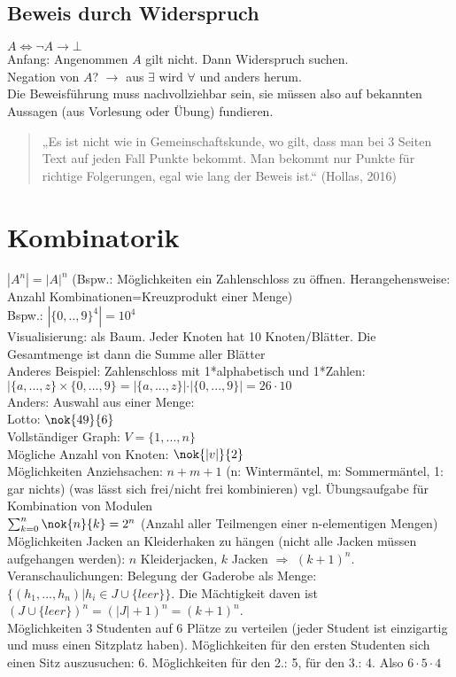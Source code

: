 \documentclass{scrreprt}
\begin{document}
\subsection{Beweis durch Widerspruch}
$A \Leftrightarrow \neg A \to \bot$\\
Anfang: Angenommen $A$ gilt nicht. Dann Widerspruch suchen.\\
Negation von $A$? $\rightarrow$ aus $\exists$ wird $\forall$ und anders herum. \\
Die Beweisführung muss nachvollziehbar sein, sie müssen also auf bekannten Aussagen (aus Vorlesung oder Übung) fundieren.
\begin{quote}
„Es ist nicht wie in Gemeinschaftskunde, wo gilt, dass man bei 3 Seiten Text auf jeden Fall Punkte bekommt. Man bekommt nur Punkte für richtige Folgerungen, egal wie lang der Beweis ist.“ (Hollas, 2016)
\end{quote}

\section{Kombinatorik}
$|A^n|=|A|^n$ (Bspw.: Möglichkeiten ein Zahlenschloss zu öffnen. Herangehensweise: Anzahl Kombinationen=Kreuzprodukt einer Menge)\\
Bspw.: $|\{0,..,9\}^4|=10^4$\\
Visualisierung: als Baum. Jeder Knoten hat 10 Knoten/Blätter. Die Gesamtmenge ist dann die Summe aller Blätter\\
Anderes Beispiel: Zahlenschloss mit 1*alphabetisch und 1*Zahlen:\\
$|\{a,...,z\}\times \{0,...,9\}= |\{a,...,z\}| \cdot |\{0,...,9\}| =26\cdot 10$ \bigskip\\
Anders: Auswahl aus einer Menge:\\
Lotto: $\nok{49}{6}$\\
Vollständiger Graph: $V=\{1,...,n\}$\\
Mögliche Anzahl von Knoten: $\nok{|v|}{2}$\\
Möglichkeiten Anziehsachen: $n+m+1$ (n: Wintermäntel, m: Sommermäntel, 1: gar nichts) (was lässt sich frei/nicht frei kombinieren) vgl. Übungsaufgabe für Kombination von Modulen\\
$\sum_{k=0}^{n}\nok{n}{k}=2^n$ (Anzahl aller Teilmengen einer n-elementigen Mengen)\medskip\\
Möglichkeiten Jacken an Kleiderhaken zu hängen (nicht alle Jacken müssen aufgehangen werden): $n$ Kleiderjacken, $k$ Jacken $\Rightarrow$ $(k+1)^n$. Veranschaulichungen: Belegung der Gaderobe als Menge: $\{(h_1,...,h_n)|h_i \in J \cup \{leer\}\}$. Die Mächtigkeit daven ist $(J\cup \{leer\})^n=(|J|+1)^n=(k+1)^n$.\\
Möglichkeiten 3 Studenten auf 6 Plätze zu verteilen (jeder Student ist einzigartig und muss einen Sitzplatz haben). Möglichkeiten für den ersten Studenten sich einen Sitz auszusuchen: 6. Möglichkeiten für den 2.: 5, für den 3.: 4. Also $6\cdot 5 \cdot 4$





\printbibliography
\end{document}
